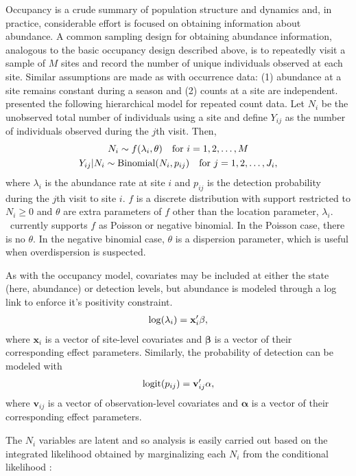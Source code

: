 \documentclass[article,shortnames]{jss}
\DeclareMathOperator{\logit}{logit}
\DeclareMathOperator{\Bin}{Binomial}
\newcommand{\um}{\pkg{unmarked}}
\begin{document}
Occupancy is a crude summary of population structure and dynamics and, in 
practice, considerable effort is focused on obtaining information about 
abundance. A common sampling design for obtaining abundance information, 
analogous to the basic occupancy design described above, is to 
repeatedly visit a sample of $M$ sites and
record the number of unique individuals observed at each site.
Similar assumptions are made as with occurrence data: (1) abundance at
a site remains constant during a season and (2) counts at a site are
independent.  \citet{Royle2004} presented the following hierarchical model for
repeated count data.  Let $N_i$ be the unobserved total number of
individuals using a site and define $Y_{ij}$ as the number of individuals 
observed during the $j$th visit.  Then,
\begin{gather}
\label{eq:pc2}
  N_i \sim f(\lambda_i, \theta) \text{\quad for $i=1,2,\dots,M$}  \notag\\
  Y_{ij}|N_{i} \sim \Bin(N_i, p_{ij})\text{\quad for $j=1,2,\dots,J_{i}$} \notag,
\end{gather}
where $\lambda_i$ is the abundance rate at site $i$ and $p_{ij}$ is
the detection probability during the $j$th visit to site $i$.  $f$ is
a discrete distribution with support restricted to $N_{i} \ge 0$ and
$\theta$ are extra parameters of $f$ other than the location
parameter, $\lambda_{i}$.  \um\ currently supports $f$ as Poisson or
negative binomial.  In the Poisson case, there is no $\theta$.  In the
negative binomial case, $\theta$ is a dispersion parameter, which is
useful when overdispersion is suspected.

As with the occupancy model, covariates may be included at either the
state (here, abundance) or detection levels, but abundance is modeled
through a log link to enforce it's positivity constraint.
\begin{gather}
  \log(\lambda_i) = \mathbf x_i' \mathbf \beta, \notag
\end{gather}
where $\mathbf x_i$ is a vector of site-level covariates and $\mathbf \beta$
is a vector of their corresponding effect parameters.  Similarly, the
probability of detection can be modeled with
\begin{gather}
  \logit(p_{ij}) = \mathbf v_{ij}' \mathbf \alpha, \notag
\end{gather}
where $\mathbf v_{ij}$ is a vector of observation-level covariates and
$\mathbf \alpha$ is a vector of their corresponding effect parameters.

The $N_{i}$ variables are latent and so analysis is easily carried out based on 
the integrated likelihood obtained by marginalizing each $N_{i}$ from the 
conditional likelihood \citet{Royle2004b}:
\end{document}
